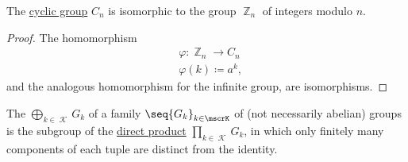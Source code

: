 \begin{proposition}\label{thm:cyclic_group_isomorphic_to_integers_modulo_n}
  The \hyperref[def:cyclic_group]{cyclic group} \( C_n \) is isomorphic to the group \hyperref[thm:group_of_integers_modulo]{\( \BbbZ_n \)} of integers modulo \( n \).
\end{proposition}
\begin{proof}
  The homomorphism
  \begin{equation*}
    \begin{aligned}
      &\varphi: \BbbZ_n \to C_n \\
      &\varphi(k) \coloneqq a^k,
    \end{aligned}
  \end{equation*}
  and the analogous homomorphism for the infinite group, are isomorphisms.
\end{proof}

\begin{definition}\label{def:group_direct_sum}
  The  \( \bigoplus_{k \in \mscrK} G_k \) of a family \( \seq{ G_k }_{k \in \mscrK} \) of (not necessarily abelian) groups is the subgroup of the \hyperref[def:group_direct_product]{direct product} \( \prod_{k \in \mscrK} G_k \), in which only finitely many components of each tuple are distinct from the identity.
\end{definition}

